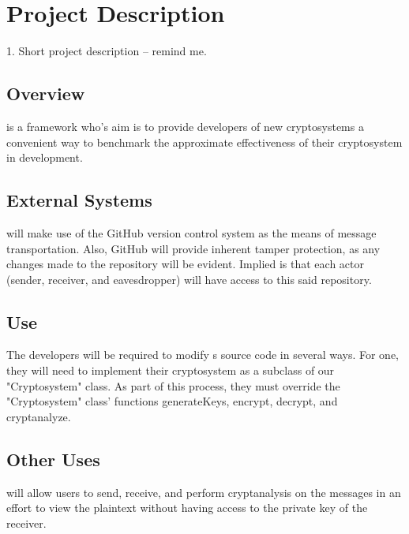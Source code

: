 \section{Project Description}

1. Short project description -- remind me.


\subsection{Overview}
\cry{} is a framework who's aim is to provide developers of
new cryptosystems a convenient way to benchmark the
approximate effectiveness of their cryptosystem in
development.

\subsection{External Systems}
\cry{} will make use of the GitHub version control system
as the means of message transportation. Also, GitHub will
provide inherent tamper protection, as any changes made
to the repository will be evident. Implied is that each
actor (sender, receiver, and eavesdropper) will have access
to this said repository.

\subsection{Use}
The developers will be required to modify \cry{} s source
code in several ways. For one, they will need to implement
their cryptosystem as a subclass of our "Cryptosystem"
class. As part of this process, they must override the
"Cryptosystem" class' functions generateKeys, encrypt,
decrypt, and cryptanalyze.

\subsection{Other Uses}
\cry{} will allow users to send, receive, and perform
cryptanalysis on the messages in an effort to view the
plaintext without having access to the private key of
the receiver.
